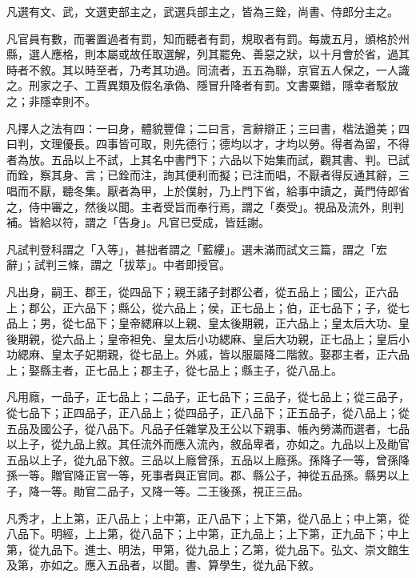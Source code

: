 
\begin{pinyinscope}

 凡選有文、武，文選吏部主之，武選兵部主之，皆為三銓，尚書、侍郎分主之。



 凡官員有數，而署置過者有罰，知而聽者有罰，規取者有罰。每歲五月，頒格於州縣，選人應格，則本屬或故任取選解，列其罷免、善惡之狀，以十月會於省，過其時者不敘。其以時至者，乃考其功過。同流者，五五為聯，京官五人保之，一人識之。刑家之子、工賈異類及假名承偽、隱冒升降者有罰。文書粟錯，隱幸者駁放之；非隱幸則不。



 凡擇人之法有四：一曰身，體貌豐偉；二曰言，言辭辯正；三曰書，楷法遒美；四曰判，文理優長。四事皆可取，則先德行；德均以才，才均以勞。得者為留，不得者為放。五品以上不試，上其名中書門下；六品以下始集而試，觀其書、判。已試而銓，察其身、言；已銓而注，詢其便利而擬；已注而唱，不厭者得反通其辭，三唱而不厭，聽冬集。厭者為甲，上於僕射，乃上門下省，給事中讀之，黃門侍郎省之，侍中審之，然後以聞。主者受旨而奉行焉，謂之「奏受」。視品及流外，則判補。皆給以符，謂之「告身」。凡官已受成，皆廷謝。



 凡試判登科謂之「入等」，甚拙者謂之「藍縷」。選未滿而試文三篇，謂之「宏辭」；試判三條，謂之「拔萃」。中者即授官。



 凡出身，嗣王、郡王，從四品下；親王諸子封郡公者，從五品上；國公，正六品上；郡公，正六品下；縣公，從六品上；侯，正七品上；伯，正七品下；子，從七品上；男，從七品下；皇帝緦麻以上親、皇太後期親，正六品上；皇太后大功、皇後期親，從六品上；皇帝袒免、皇太后小功緦麻、皇后大功親，正七品上；皇后小功緦麻、皇太子妃期親，從七品上。外戚，皆以服屬降二階敘。娶郡主者，正六品上；娶縣主者，正七品上；郡主子，從七品上；縣主子，從八品上。



 凡用廕，一品子，正七品上；二品子，正七品下；三品子，從七品上；從三品子，從七品下；正四品子，正八品上；從四品子，正八品下；正五品子，從八品上；從五品及國公子，從八品下。凡品子任雜掌及王公以下親事、帳內勞滿而選者，七品以上子，從九品上敘。其任流外而應入流內，敘品卑者，亦如之。九品以上及勛官五品以上子，從九品下敘。三品以上廕曾孫，五品以上廕孫。孫降子一等，曾孫降孫一等。贈官降正官一等，死事者與正官同。郡、縣公子，神從五品孫。縣男以上子，降一等。勛官二品子，又降一等。二王後孫，視正三品。



 凡秀才，上上第，正八品上；上中第，正八品下；上下第，從八品上；中上第，從八品下。明經，上上第，從八品下；上中第，正九品上；上下第，正九品下；中上第，從九品下。進士、明法，甲第，從九品上；乙第，從九品下。弘文、崇文館生及第，亦如之。應入五品者，以聞。書、算學生，從九品下敘。




\end{pinyinscope}
